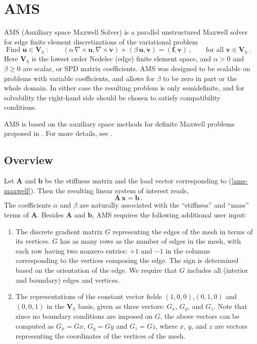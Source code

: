 
\section{AMS}
\label{AMS}

AMS (Auxiliary space Maxwell Solver) is a parallel unstructured Maxwell
solver for edge finite element discretizations of the variational problem
\begin{equation} \label{ams-maxwell}
\mbox{Find } {\mathbf u} \in {\mathbf V}_h \>:\qquad
(\alpha\, \nabla \times {\mathbf u},  \nabla \times {\mathbf v}) +
(\beta\, {\mathbf u},  {\mathbf v}) = ({\mathbf f},  {\mathbf v})\,,
\qquad \mbox{for all } {\mathbf v} \in {\mathbf V}_h \,.
\end{equation}
Here ${\mathbf V}_h$ is the lowest order Nedelec (edge) finite element space,
and $\alpha>0$ and $\beta \ge 0$ are scalar, or SPD matrix coefficients.
AMS was designed to be scalable on problems with variable coefficients,
and allows for $\beta$ to be zero in part or the whole domain.
In either  case the resulting problem is only semidefinite, and for solvability
the right-hand side should be chosen to satisfy compatibility conditions.

AMS is based on the auxiliary space methods for definite Maxwell
problems proposed in \cite{xu_H_curl}.
For more details, see \cite{h_curl_amg_report,ams_report}.

\subsection{Overview}
Let ${\mathbf A}$ and ${\mathbf b}$ be the stiffness matrix and  the
load vector corresponding to (\ref{ams-maxwell}). Then the resulting
linear system of interest reads,
\begin{equation} \label{ams-maxwell-ls}
{\mathbf A}\, {\mathbf x} = {\mathbf b} \,.
\end{equation}
The coefficients $\alpha$ and $\beta$ are naturally associated with
the ``stiffness'' and ``mass'' terms of ${\mathbf A}$.
Besides ${\mathbf A}$ and ${\mathbf b}$, AMS requires the following
additional user input:
\begin{enumerate}
\item The discrete gradient matrix $G$ representing the edges of
the mesh in terms of its vertices. $G$ has as many rows as the number
of edges in the mesh, with each row having two nonzero entries:
$+1$ and $-1$ in the columns corresponding to the vertices composing
the edge. The sign is determined based on the orientation of the edge.
We require that $G$ includes all (interior and boundary) edges
and vertices.

\item The representations of the constant vector fields $(1,0,0)$,$(0,1,0)$ and
$(0,0,1)$ in the ${\mathbf V}_h$ basis, given as three vectors: $G_x$, $G_y$, and $G_z$.
Note that since no boundary conditions are imposed on $G$, the above vectors
can be computed as $G_x = G x$, $G_y = G y$ and $G_z = G z$, where
$x$, $y$, and $z$ are vectors representing the coordinates of the vertices of the mesh.
\end{enumerate}

